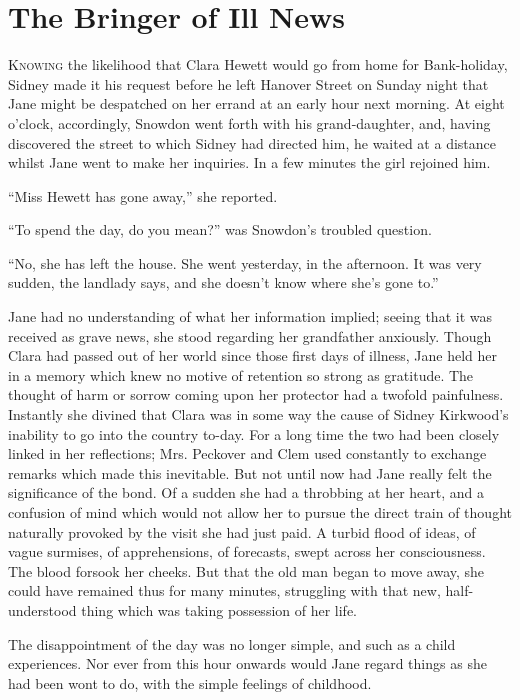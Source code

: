 \chapter{The Bringer of Ill News}

\textsc{Knowing} the likelihood that Clara Hewett would go from home for
Bank-holiday, Sidney made it his request before he left Hanover Street
on Sunday night that Jane might be despatched on her errand at an early
hour next morning. At eight o'clock, accordingly, Snowdon went forth
with his grand-daughter, and, having discovered the street to which
Sidney had directed him, he waited at a distance whilst Jane went to
make her inquiries. In a few minutes the girl rejoined him.

``Miss Hewett has gone away,'' she reported.

``To spend the day, do you mean?'' was Snowdon's troubled question.

``No, she has left the house. She went yesterday, in the afternoon. It
was very {\protect\hypertarget{277}{}{}}sudden, the landlady says, and
she doesn't know where she's gone to.''

Jane had no understanding of what her information implied; seeing that
it was received as grave news, she stood regarding her grandfather
anxiously. Though Clara had passed out of her world since those first
days of illness, Jane held her in a memory which knew no motive of
retention so strong as gratitude. The thought of harm or sorrow coming
upon her protector had a twofold painfulness. Instantly she divined that
Clara was in some way the cause of Sidney Kirkwood's inability to go
into the country to-day. For a long time the two had been closely linked
in her reflections; Mrs. Peckover and Clem used constantly to exchange
remarks which made this inevitable. But not until now had Jane really
felt the significance of the bond. Of a sudden she had a throbbing at
her heart, and a confusion of mind which would not allow her to pursue
the direct train of thought naturally provoked by the visit she had just
paid. A turbid flood of ideas, of {\protect\hypertarget{278}{}{}}vague
surmises, of apprehensions, of forecasts, swept across her
consciousness. The blood forsook her cheeks. But that the old man began
to move away, she could have remained thus for many minutes, struggling
with that new, half-understood thing which was taking possession of her
life.

The disappointment of the day was no longer simple, and such as a child
experiences. Nor ever from this hour onwards would Jane regard things as
she had been wont to do, with the simple feelings of childhood.

